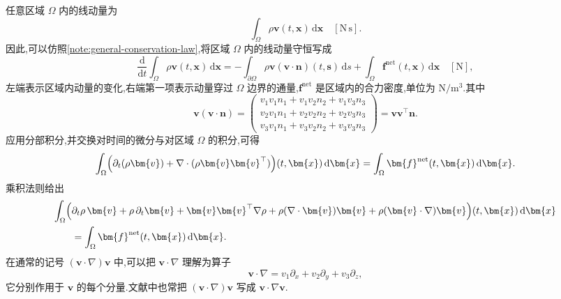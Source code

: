 \begin{note}[线动量守恒]\label{note:momentum-conservation}
任意区域 $\Omega$ 内的线动量为
\begin{equation*}
  \int_{\Omega}\rho\bm{v}(t,\bm{x})\,\mathrm{d}\bm{x}
  \quad[\mathrm{N}\,\mathrm{s}].
\end{equation*}
因此,可以仿照\cref{note:general-conservation-law},将区域 $\Omega$ 内的线动量守恒写成
\begin{equation*}
  \frac{\mathrm{d}}{\mathrm{d}t}\int_{\Omega}\rho\bm{v}(t,\bm{x})\,\mathrm{d}\bm{x}
  =-\int_{\partial\Omega}\rho\bm{v}(\bm{v}\cdot\bm{n})(t,\bm{s})\,\mathrm{d}s
    +\int_{\Omega}\bm{f}^{\mathrm{net}}(t,\bm{x})\,\mathrm{d}\bm{x}
  \quad[\mathrm{N}],
\end{equation*}
左端表示区域内动量的变化,右端第一项表示动量穿过 $\Omega$ 边界的通量,$\bm{f}^{\mathrm{net}}$ 是区域内的合力密度,单位为 $\mathrm{N}/\mathrm{m}^3$.其中
\begin{equation*}
  \bm{v}(\bm{v}\cdot\bm{n})
  =\begin{pmatrix}
    v_1v_1n_1+v_1v_2n_2+v_1v_3n_3\\
    v_2v_1n_1+v_2v_2n_2+v_2v_3n_3\\
    v_3v_1n_1+v_3v_2n_2+v_3v_3n_3
  \end{pmatrix}
  =\bm{v}\bm{v}^{\top}\bm{n}.
\end{equation*}
应用分部积分,并交换对时间的微分与对区域 $\Omega$ 的积分,可得
\begin{equation*}
  \int_{\Omega}\Bigl(\partial_t(\rho\bm{v})
    +\nabla\cdot(\rho\bm{v}\bm{v}^{\top})\Bigr)(t,\bm{x})\,\mathrm{d}\bm{x}
  =\int_{\Omega}\bm{f}^{\mathrm{net}}(t,\bm{x})\,\mathrm{d}\bm{x}.
\end{equation*}
乘积法则给出
\begin{equation}\label{eq:momentum-product-rule}
\begin{aligned}
  \int_{\Omega}\Bigl(&\partial_t\rho\,\bm{v}+\rho\,\partial_t\bm{v}
      +\bm{v}\bm{v}^{\top}\nabla\rho
      +\rho(\nabla\cdot\bm{v})\bm{v}
      +\rho(\bm{v}\cdot\nabla)\bm{v}\Bigr)(t,\bm{x})\,\mathrm{d}\bm{x}\\
  &=\int_{\Omega}\bm{f}^{\mathrm{net}}(t,\bm{x})\,\mathrm{d}\bm{x}.
\end{aligned}
\end{equation}
在通常的记号 $(\bm{v}\cdot\nabla)\bm{v}$ 中,可以把 $\bm{v}\cdot\nabla$ 理解为算子
\begin{equation*}
  \bm{v}\cdot\nabla=v_1\partial_x+v_2\partial_y+v_3\partial_z,
\end{equation*}
它分别作用于 $\bm{v}$ 的每个分量.文献中也常把 $(\bm{v}\cdot\nabla)\bm{v}$ 写成 $\bm{v}\cdot\nabla\bm{v}$.


\end{note}
